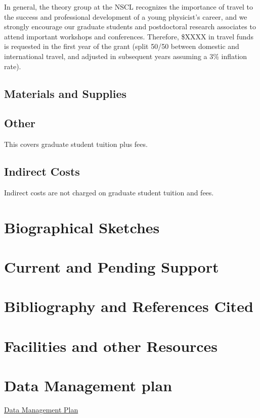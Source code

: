 \documentclass[10pt]{article}
\begin{document}
In general, the theory group at the NSCL recognizes the importance of
travel to the success and professional development of a young
physicist's career, and we strongly encourage our graduate students
and postdoctoral research associates to attend important workshops and
conferences.  Therefore, \$XXXX in travel funds is requested in the
first year of the grant (split 50/50 between domestic and
international travel, and adjusted in subsequent years assuming a 3\%
inflation rate).

\subsection{Materials and Supplies}

\subsection{Other}
This covers graduate student tuition plus fees.

\subsection{Indirect Costs}

Indirect costs are not charged on graduate student tuition and fees.




\appendix

\section{Biographical Sketches}
\section{Current and Pending Support}
\section{Bibliography and References Cited}

\section{Facilities and other Resources}
\section{Data Management plan}

\centerline{\underline{\Large{Data Management Plan}}} 
\end{document}
